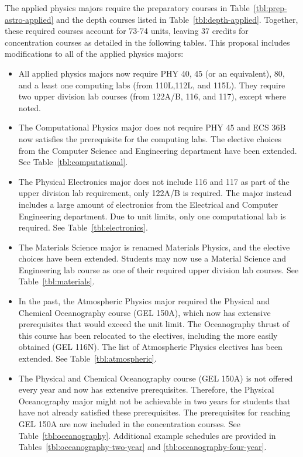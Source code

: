 \documentclass[12pt]{article}
\begin{document}
The applied physics majors require the preparatory courses in
Table~\ref{tbl:prep-astro-applied} and the depth courses listed in
Table~\ref{tbl:depth-applied}.  Together, these required courses
account for 73-74 units, leaving 37 credits for concentration courses
as detailed in the following tables.  This proposal includes
modifications to all of the applied physics majors:
\begin{itemize}

\item All applied physics majors now require PHY 40, 45 (or an
  equivalent), 80, and a least one computing labs (from 110L,112L, and
  115L).  They require two upper division lab courses (from 122A/B,
  116, and 117), except where noted.
  
\item The Computational Physics major does not require PHY 45 and ECS
  36B now satisfies the prerequisite for the computing labs.  The
  elective choices from the Computer Science and Engineering
  department have been extended.  See Table~\ref{tbl:computational}.

\item The Physical Electronics major does not include 116 and 117 as
  part of the upper division lab requirement, only 122A/B is required.
  The major instead includes a large amount of electronics from the
  Electrical and Computer Engineering department.  Due to unit limits,
  only one computational lab is required.  See
  Table~\ref{tbl:electronics}.

\item The Materials Science major is renamed Materials Physics, and
  the elective choices have been extended.  Students may now use a
  Material Science and Engineering lab course as one of their required
  upper division lab courses.  See Table~\ref{tbl:materials}.

\item In the past, the Atmospheric Physics major required the Physical
  and Chemical Oceanography course (GEL 150A), which now has extensive
  prerequisites that would exceed the unit limit.  The Oceanography
  thrust of this course has been relocated to the electives, including
  the more easily obtained (GEL 116N).  The list of Atmospheric
  Physics electives has been extended.  See
  Table~\ref{tbl:atmospheric}.

\item The Physical and Chemical Oceanography course (GEL 150A) is not
  offered every year and now has extensive prerequisites.  Therefore,
  the Physical Oceanography major might not be achievable in two years
  for students that have not already satisfied these prerequisites.
  The prerequisites for reaching GEL 150A are now included in the
  concentration courses.  See Table~\ref{tbl:oceanography}.
  Additional example schedules are provided in
  Tables~\ref{tbl:oceanography-two-year} and
  \ref{tbl:oceanography-four-year}.
  

\end{itemize}
\end{document}
